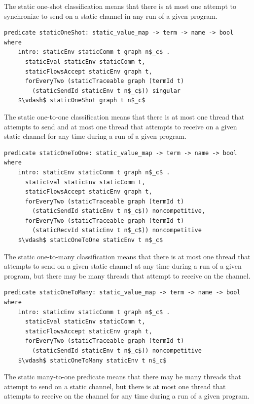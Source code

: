 \documentclass[letterpaper, 11pt]{extarticle}
\begin{document}
The static one-shot classification means that there is at most one attempt
to synchronize to send on a static channel in any run of a given program.

\begin{lstlisting}[language=logic, mathescape]
  predicate staticOneShot: static_value_map -> term -> name -> bool where
    intro: staticEnv staticComm t graph n$_c$ .
      staticEval staticEnv staticComm t,
      staticFlowsAccept staticEnv graph t,
      forEveryTwo (staticTraceable graph (termId t)
        (staticSendId staticEnv t n$_c$)) singular
    $\vdash$ staticOneShot graph t n$_c$
\end{lstlisting}

The static one-to-one classification means that there is at most one thread that attempts to
send and at most one thread that attempts to receive on a given static channel for any time
during a run of a given program.

\begin{lstlisting}[language=logic, mathescape]
  predicate staticOneToOne: static_value_map -> term -> name -> bool where
    intro: staticEnv staticComm t graph n$_c$ .
      staticEval staticEnv staticComm t,
      staticFlowsAccept staticEnv graph t,
      forEveryTwo (staticTraceable graph (termId t)
        (staticSendId staticEnv t n$_c$)) noncompetitive, 
      forEveryTwo (staticTraceable graph (termId t)
        (staticRecvId staticEnv t n$_c$)) noncompetitive
    $\vdash$ staticOneToOne staticEnv t n$_c$
\end{lstlisting}

The static one-to-many classification means that there is at most one thread that attempts to
send on a given static channel at any time during a run of a given program, but there may be
many threads that attempt to receive on the channel.

\begin{lstlisting}[language=logic, mathescape]
  predicate staticOneToMany: static_value_map -> term -> name -> bool where
    intro: staticEnv staticComm t graph n$_c$ .
      staticEval staticEnv staticComm t,
      staticFlowsAccept staticEnv graph t,
      forEveryTwo (staticTraceable graph (termId t)
        (staticSendId staticEnv t n$_c$)) noncompetitive
    $\vdash$ staticOneToMany staticEnv t n$_c$
\end{lstlisting}

The static many-to-one predicate means
that there may be many threads that attempt to send on a static channel, but there is at most
one thread that attempts to receive on the channel for any time during a run of a given
program.
\end{document}
